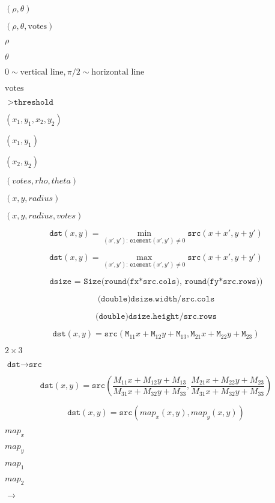 \documentclass{article}
\begin{document}
$(\rho, \theta)$
\pagebreak

$(\rho, \theta, \textrm{votes})$
\pagebreak

$\rho$
\pagebreak

$\theta$
\pagebreak

$0 \sim \textrm{vertical line}, \pi/2 \sim \textrm{horizontal line}$
\pagebreak

$\textrm{votes}$
\pagebreak

$>\texttt{threshold}$
\pagebreak

$(x_1, y_1, x_2, y_2)$
\pagebreak

$(x_1,y_1)$
\pagebreak

$(x_2, y_2)$
\pagebreak

$(votes, rho, theta)$
\pagebreak

$(x, y, radius)$
\pagebreak

$(x, y, radius, votes)$
\pagebreak

\[\texttt{dst} (x,y) = \min _{(x',y'): \, \texttt{element} (x',y') \ne0 } \texttt{src} (x+x',y+y')\]
\pagebreak

\[\texttt{dst} (x,y) = \max _{(x',y'): \, \texttt{element} (x',y') \ne0 } \texttt{src} (x+x',y+y')\]
\pagebreak

\[\texttt{dsize = Size(round(fx*src.cols), round(fy*src.rows))}\]
\pagebreak

\[\texttt{(double)dsize.width/src.cols}\]
\pagebreak

\[\texttt{(double)dsize.height/src.rows}\]
\pagebreak

\[\texttt{dst} (x,y) = \texttt{src} ( \texttt{M} _{11} x + \texttt{M} _{12} y + \texttt{M} _{13}, \texttt{M} _{21} x + \texttt{M} _{22} y + \texttt{M} _{23})\]
\pagebreak

$2\times 3$
\pagebreak

$\texttt{dst}\rightarrow\texttt{src}$
\pagebreak

\[\texttt{dst} (x,y) = \texttt{src} \left ( \frac{M_{11} x + M_{12} y + M_{13}}{M_{31} x + M_{32} y + M_{33}} , \frac{M_{21} x + M_{22} y + M_{23}}{M_{31} x + M_{32} y + M_{33}} \right )\]
\pagebreak

\[\texttt{dst} (x,y) = \texttt{src} (map_x(x,y),map_y(x,y))\]
\pagebreak

$map_x$
\pagebreak

$map_y$
\pagebreak

$map_1$
\pagebreak

$map_2$
\pagebreak

$\rightarrow$
\pagebreak
\end{document}
